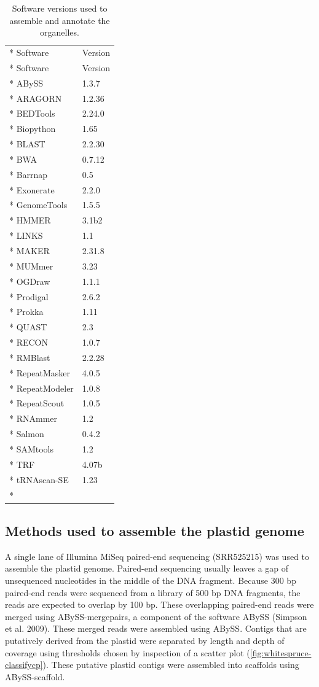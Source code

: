 \documentclass[
  12pt,
  oneside,
  openany]{book}
\begin{document}
\hypertarget{tbl:whitespruce-versions}{}
\begin{singlespace}
\small
\begin{longtable}[]{@{}ll@{}}
\caption[Software versions used to assemble and annotate the organelles.]{\label{tbl:whitespruce-versions}Software versions used to assemble and annotate the organelles.}\tabularnewline*
\toprule
Software & Version\tabularnewline*
\midrule
\endfirsthead
\toprule
Software & Version\tabularnewline*
\midrule
\endhead
ABySS & 1.3.7\tabularnewline*
ARAGORN & 1.2.36\tabularnewline*
BEDTools & 2.24.0\tabularnewline*
Biopython & 1.65\tabularnewline*
BLAST & 2.2.30\tabularnewline*
BWA & 0.7.12\tabularnewline*
Barrnap & 0.5\tabularnewline*
Exonerate & 2.2.0\tabularnewline*
GenomeTools & 1.5.5\tabularnewline*
HMMER & 3.1b2\tabularnewline*
LINKS & 1.1\tabularnewline*
MAKER & 2.31.8\tabularnewline*
MUMmer & 3.23\tabularnewline*
OGDraw & 1.1.1\tabularnewline*
Prodigal & 2.6.2\tabularnewline*
Prokka & 1.11\tabularnewline*
QUAST & 2.3\tabularnewline*
RECON & 1.0.7\tabularnewline*
RMBlast & 2.2.28\tabularnewline*
RepeatMasker & 4.0.5\tabularnewline*
RepeatModeler & 1.0.8\tabularnewline*
RepeatScout & 1.0.5\tabularnewline*
RNAmmer & 1.2\tabularnewline*
Salmon & 0.4.2\tabularnewline*
SAMtools & 1.2\tabularnewline*
TRF & 4.07b\tabularnewline*
tRNAscan-SE & 1.23\tabularnewline*
\bottomrule
\end{longtable}
\end{singlespace}

\hypertarget{methods-used-to-assemble-the-plastid-genome}{%
\subsection{Methods used to assemble the plastid genome}\label{methods-used-to-assemble-the-plastid-genome}}

A single lane of Illumina MiSeq paired-end sequencing (SRR525215) was used to assemble the plastid genome. Paired-end sequencing usually leaves a gap of unsequenced nucleotides in the middle of the DNA fragment. Because 300 bp paired-end reads were sequenced from a library of 500 bp DNA fragments, the reads are expected to overlap by 100 bp. These overlapping paired-end reads were merged using ABySS-mergepairs, a component of the software ABySS (Simpson et al. 2009). These merged reads were assembled using ABySS. Contigs that are putatively derived from the plastid were separated by length and depth of coverage using thresholds chosen by inspection of a scatter plot (\cref{fig:whitespruce-classifycp}). These putative plastid contigs were assembled into scaffolds using ABySS-scaffold.
\end{document}
